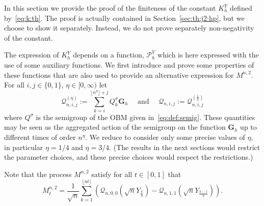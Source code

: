 \documentclass[12pt]{article}
\numberwithin{equation}{section}
\theoremstyle{definition}
\theoremstyle{remark}
\newcommand{\NN}{\mathbb{N}}
\newcommand{\cQ}{\mathcal{Q}}
\newcommand{\bfG}[1]{\mathbf{G}_{#1}}
\begin{document}
In this section we provide the proof of the finiteness of the constant $K_h^Y$ defined by~\eqref{eq:k:th}. 
The proof is actually contained in Section~\ref{sec:th:j2:hp}, but we choose to show it separately.
Instead, we do not prove separately non-negativity of the constant.

The expression of $K_h^Y$ depends on a function, $\mathcal{P}_h^Y$ which is here expressed with the use of some auxiliary functions.
We first introduce and prove some properties of these functions that are also used to provide an alternative expression for $M^{n,2}$.
%
%
%
For all $i,j\in \{0,1\}$, $\eta\in [0,\infty)$ let 
\begin{equation} \label{eq:cQ}
	\cQ^{(\eta)}_{n, i , j} := \sum_{k=i}^{\lfloor n^{\eta}\rfloor + j } Q^\sigma_k \bfG{h} \quad \text{ and } \quad \cQ_{n, i , j}:=\cQ^{(\frac14)}_{n, i , j}
\end{equation}
where $Q^\sigma$ is the semigroup of the OBM given in~\eqref{eq:def:semig}. 
These quantities may be seen as the aggregated action of the semigroup on the function $\bfG{h}$ up to different times of order $n^\eta$. We reduce to consider only some precise values of $\eta$, in particular $\eta=1/4$ and $\eta=3/4$. 
(The results in the next sections would restrict the parameter choices, and these precise choices would respect the restrictions.) 

%
Note that the process $M^{n,2}$ satisfy for all $t\in [0,1]$ that
\begin{equation} \label{eq:dec:m3}
	M^{n,2}_t   =  \frac1{\sqrt{n}} \sum_{k=1}^{\lfloor n t \rfloor}  \left(\cQ_{n,0,0}(\sqrt{n} Y_{\frac k n}) - \cQ_{n,1,1}(\sqrt{n} Y_{\frac{k-1}{n}})\right).
\end{equation}
%
\end{document}
